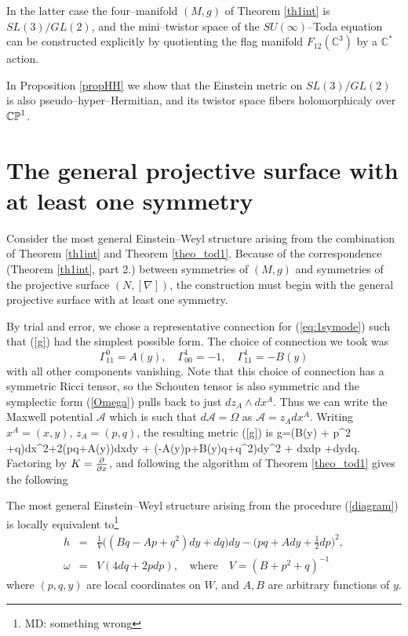  In the latter case the four--manifold $(M, g)$ of Theorem \ref{th1int} is $SL(3)/GL(2)$, and the mini--twistor space
of the $SU(\infty)$--Toda equation can be constructed explicitly by quotienting the flag manifold $F_{12}(\mathbb{C}^3)$ by a $\mathbb{C}^*$ action. 

In Proposition \ref{propHH} we show that the Einstein metric on $SL(3)/GL(2)$  is also pseudo--hyper--Hermitian, and its twistor space fibers holomorphicaly over $\mathbb{CP}^1$.

\section{The general projective surface with at least one symmetry}
\label{general}




Consider the most general Einstein--Weyl structure arising from the combination
of Theorem \ref{th1int} and Theorem \ref{theo_tod1}. Because of the correspondence 
(Theorem \ref{th1int}, part 2.)
between symmetries of $(M, g)$ and symmetries of the projective surface $(N, [\nabla])$, the construction must begin with the general projective surface with at least one symmetry. 
 
By trial and error, we chose a representative connection for (\ref{eq:1symode}) such that (\ref{g}) had the simplest possible form. The choice of connection we took was
\[
\Gamma^{0}_{11}=A(y),\quad \Gamma^{1}_{00}=-1, \quad \Gamma^{1}_{11}=-B(y)
\]
with all other components vanishing. Note that this choice of connection has a symmetric Ricci tensor, so the Schouten tensor is also symmetric and the symplectic form (\ref{Omega}) pulls back to just $dz_A\wedge dx^A$. Thus we can write the Maxwell potential $\mathcal{A}$ which is such that $d\mathcal{A}=\Omega$ as $\mathcal{A}=z_Adx^A$. Writing $x^A=(x,y)$, $z_A=(p,q)$, the resulting metric (\ref{g}) is
\be
\label{einstein_1}
g=(B(y) + p^2 +q)dx^2+2(pq+A(y))dxdy + (-A(y)p+B(y)q+q^2)dy^2 + dxdp +dydq.
\ee
Factoring by $K=\frac{\partial}{\partial x}$, and following the algorithm of Theorem
\ref{theo_tod1} gives the following
\begin{prop}
\label{prop1}
The most general  Einstein--Weyl structure arising
from the procedure (\ref{diagram}) is locally equivalent to\footnote{MD: something wrong}
\begin{eqnarray}
\label{ew_final}
h&=&\frac{1}{V}\big((Bq -Ap+ q^2)dy+dq\big)dy
-\Big({pq+A}dy+\frac{1}{2}dp\Big)^2, \label{genh} \\
\omega&=&V(4dq+2 pdp), \quad\mbox{where}\quad V=
({B}+ p^2+q)^{-1}\nonumber
\end{eqnarray}
where $(p, q, y)$ are local coordinates on $W$, and $A, B$ are arbitrary functions of $y$.
\end{prop}
